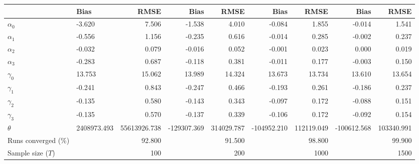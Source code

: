 
\begin{tabular}[t]{llrrrrrrr}
\toprule
  & Bias & RMSE & Bias & RMSE & Bias & RMSE & Bias & RMSE\\
\midrule
$\alpha_{0}$ & -3.620 & 7.506 & -1.538 & 4.010 & -0.084 & 1.855 & -0.014 & 1.541\\
$\alpha_{1}$ & -0.556 & 1.156 & -0.235 & 0.616 & -0.014 & 0.285 & -0.002 & 0.237\\
$\alpha_{2}$ & -0.032 & 0.079 & -0.016 & 0.052 & -0.001 & 0.023 & 0.000 & 0.019\\
$\alpha_{3}$ & -0.283 & 0.687 & -0.118 & 0.381 & -0.011 & 0.177 & -0.003 & 0.150\\
$\gamma_{0}$ & 13.753 & 15.062 & 13.989 & 14.324 & 13.673 & 13.734 & 13.610 & 13.654\\
$\gamma_{1}$ & -0.241 & 0.843 & -0.247 & 0.466 & -0.193 & 0.261 & -0.186 & 0.237\\
$\gamma_{2}$ & -0.135 & 0.580 & -0.143 & 0.343 & -0.097 & 0.172 & -0.088 & 0.151\\
$\gamma_{3}$ & -0.135 & 0.570 & -0.137 & 0.339 & -0.106 & 0.172 & -0.092 & 0.154\\
$\theta$ & 2408973.493 & 55613926.738 & -129307.369 & 314029.787 & -104952.210 & 112119.049 & -100612.568 & 103340.991\\
Runs converged (\%) &  & 92.800 &  & 91.500 &  & 98.800 &  & 99.900\\
Sample size ($T$) &  & 100 &  & 200 &  & 1000 &  & 1500\\
\bottomrule
\end{tabular}
